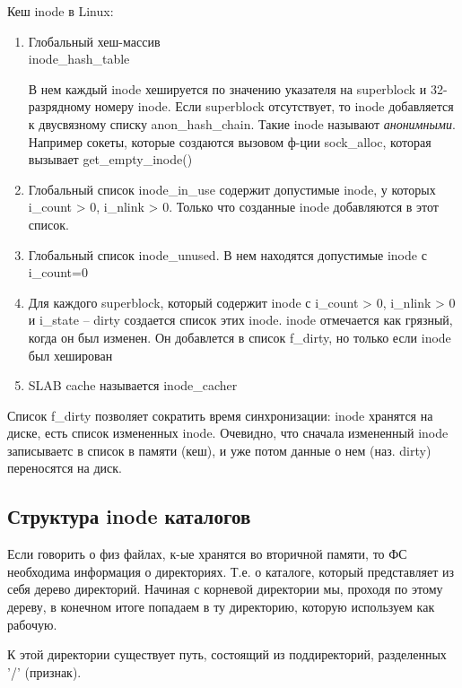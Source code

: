 Кеш inode в Linux:
\begin{enumerate}
    \item Глобальный хеш-массив \\ inode\_hash\_table

    В нем каждый inode хешируется по значению указателя на superblock и 32-разрядному номеру inode. Если superblock отсутствует, то inode добавляется к двусвязному списку anon\_hash\_chain. Такие inode называют \textit{анонимными}. Например сокеты, которые создаются вызовом ф-ции sock\_alloc, которая вызывает get\_empty\_inode()

    \item Глобальный список inode\_in\_use содержит допустимые inode, у которых i\_count > 0, i\_nlink > 0.
    Только что созданные inode добавляются в этот список.

    \item Глобальный список inode\_unused. В нем находятся допустимые inode с i\_count=0

    \item Для каждого superblock, который содержит inode с i\_count > 0, i\_nlink > 0 и i\_state -- dirty создается список этих inode. inode отмечается как грязный, когда он был изменен. Он добавлется в список f\_dirty, но только если inode был хеширован

    \item SLAB cache называется inode\_cacher
    
\end{enumerate}

Список f\_dirty позволяет сократить время синхронизации: inode хранятся на диске, есть список измененных inode. Очевидно, что сначала измененный inode записываетс в список в памяти (кеш), и уже потом данные о нем (наз. dirty) переносятся на диск.

\subsection{Структура inode каталогов}

Если говорить о физ файлах, к-ые хранятся во вторичной памяти, то ФС необходима информация о директориях. Т.е. о каталоге, который представляет из себя дерево директорий. Начиная с корневой директории мы, проходя по этому дереву, в конечном итоге попадаем в ту директорию, которую используем как рабочую.

К этой директории существует путь, состоящий из поддиректорий, разделенных '/' (признак).

